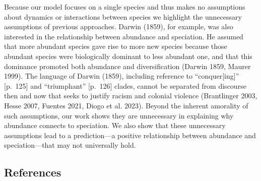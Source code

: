 \documentclass[
  letterpaper,
  DIV=11,
  numbers=noendperiod]{scrartcl}
\begin{document}
Because our model focuses on a single species and thus makes no
assumptions about dynamics or interactions between species we highlight
the unnecessary assumptions of previous approaches. Darwin (1859), for
example, was also interested in the relationship between abundance and
speciation. He assumed that more abundant species gave rise to more new
species because those abundant species were biologically dominant to
less abundant one, and that this dominance promoted both abundance and
diversification (Darwin 1859, Maurer 1999). The language of Darwin
(1859), including reference to ``conquer{[}ing{]}'' {[}p.~125{]} and
``triumphant'' {[}p.~126{]} clades, cannot be separated from discourse
then and now that seeks to justify racism and colonial violence
(Brantlinger 2003, Hesse 2007, Fuentes 2021, Diogo et al. 2023). Beyond
the inherent amorality of such assumptions, our work shows they are
unnecessary in explaining why abundance connects to speciation. We also
show that these unnecessary assumptions lead to a prediction---a
positive relationship between abundance and speciation---that may not
universally hold.

\subsection*{References}\label{references}
\end{document}
